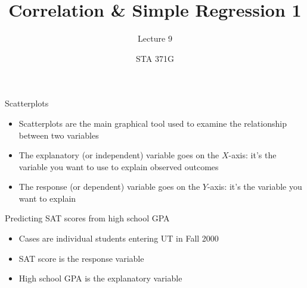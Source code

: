 \documentclass{beamer}\usepackage[]{graphicx}\usepackage[]{color}
\title{Correlation \& Simple Regression 1}
\subtitle{Lecture 9}
\author{STA 371G}
\makeatletter
\newcommand{\hlopt}[1]{\textcolor[rgb]{1,0.894,0.769}{#1}}%
\newcommand{\hlstd}[1]{\textcolor[rgb]{1,0.894,0.769}{#1}}%
\newcommand{\hlkwd}[1]{\textcolor[rgb]{1,0.78,0.769}{#1}}%
\newenvironment{kframe}{%
 \def\at@end@of@kframe{}%
 \ifinner\ifhmode%
  \def\at@end@of@kframe{\end{minipage}}%
  \begin{minipage}{\columnwidth}%
 \fi\fi%
 \def\FrameCommand##1{\hskip\@totalleftmargin \hskip-\fboxsep
 \colorbox{shadecolor}{##1}\hskip-\fboxsep
     \hskip-\linewidth \hskip-\@totalleftmargin \hskip\columnwidth}%
 \MakeFramed {\advance\hsize-\width
   \@totalleftmargin\z@ \linewidth\hsize
   \@setminipage}}%
 {\par\unskip\endMakeFramed%
 \at@end@of@kframe}
\newenvironment{knitrout}{}{} %
\makeatother
\begin{document}
  
  
  

  \frame{\maketitle}



  \begin{darkframes}
    \begin{frame}{Scatterplots}
      \begin{itemize}
        \item \alert{Scatterplots} are the main graphical tool used to examine the relationship between two variables
        \item The \alert{explanatory} (or \alert{independent}) variable goes on the $X$-axis: it's the variable you want to use to explain observed outcomes
        \item The \alert{response} (or \alert{dependent}) variable goes on the $Y$-axis: it's the variable you want to explain
      \end{itemize}
    \end{frame}

    \begin{frame}{Predicting SAT scores from high school GPA}
      \begin{itemize}
        \item Cases are individual students entering UT in Fall 2000
        \item SAT score is the response variable
        \item High school GPA is the explanatory variable
      \end{itemize}
    \end{frame}

\end{darkframes}
\end{document}
